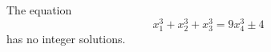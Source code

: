 \begin{proposition}\label{eq:115}
    The equation
\[
    x_1^3+x_2^3+x_3^3=9x_4^3\pm4
\]
    has no integer solutions.
\end{proposition}
